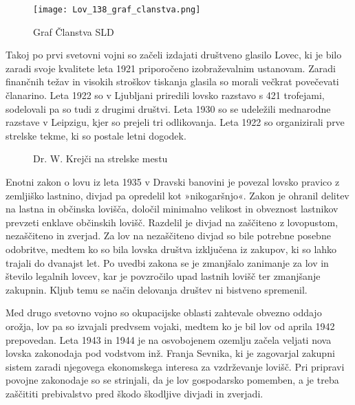 \documentclass[a4paper,12pt,openright]{book}
\begin{document}
\begin{figure}[h!]
    \centering
    \captionsetup{skip=5pt}
    \texttt{[image: Lov\_138\_graf\_clanstva.png]}
    \caption{Graf Članstva SLD \cite[138]{Lov}}
    \label{fig:lov_138}
\end{figure}

Takoj po prvi svetovni vojni so začeli izdajati društveno glasilo Lovec, ki je bilo zaradi svoje kvalitete leta 1921 priporočeno izobraževalnim ustanovam.
Zaradi finančnih težav in visokih stroškov tiskanja glasila so morali večkrat povečevati članarino.
Leta 1922 so v Ljubljani priredili lovsko razstavo s 421 trofejami, sodelovali pa so tudi z drugimi društvi.
Leta 1930 so se udeležili mednarodne razstave v Leipzigu, kjer so prejeli tri odlikovanja.
Leta 1922 so organizirali prve strelske tekme, ki so postale letni dogodek.\cite{Lov_129_149}

\begin{figure}[h!] 
  \centering
  \caption{Dr. W. Krejči na strelske mestu \cite{bolcina_osebna}}
  \label{fig:dr_w_krejci}
\end{figure}

Enotni zakon o lovu iz leta 1935 v Dravski banovini je povezal lovsko pravico z zemljiško lastnino, divjad pa opredelil kot »nikogaršnjo«. 
Zakon je ohranil delitev na lastna in občinska lovišča, določil minimalno velikost in obveznost lastnikov prevzeti enklave občinskih lovišč. 
Razdelil je divjad na zaščiteno z lovopustom, nezaščiteno in zverjad. 
Za lov na nezaščiteno divjad so bile potrebne posebne odobritve, medtem ko so bila lovska društva izključena iz zakupov, ki so lahko trajali do dvanajst let. \cite{Lov_170_175}
Po uvedbi zakona se je zmanjšalo zanimanje za lov in število legalnih lovcev, kar je povzročilo upad lastnih lovišč ter zmanjšanje zakupnin. 
Kljub temu se način delovanja društev ni bistveno spremenil.\cite{Lov_176_178}

Med drugo svetovno vojno so okupacijske oblasti zahtevale obvezno oddajo orožja, lov pa so izvajali predvsem vojaki, medtem ko je bil lov od aprila 1942 prepovedan. 
Leta 1943 in 1944 je na osvobojenem ozemlju začela veljati nova lovska zakonodaja pod vodstvom inž. Franja Sevnika, ki je zagovarjal zakupni sistem zaradi njegovega ekonomskega interesa za vzdrževanje lovišč. 
Pri pripravi povojne zakonodaje so se strinjali, da je lov gospodarsko pomemben, a je treba zaščititi prebivalstvo pred škodo škodljive divjadi in zverjadi.\cite{Lov_197_201}
\end{document}
